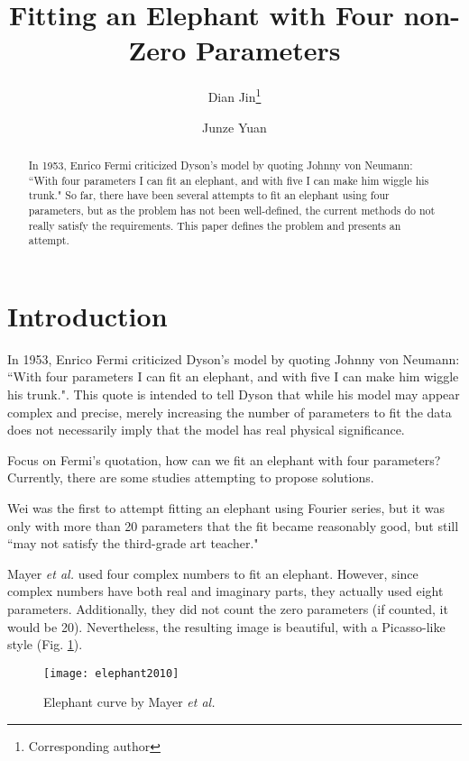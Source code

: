 \documentclass{article}
\title{Fitting an Elephant with Four non-Zero Parameters}
\author[1]{Dian Jin\thanks{Corresponding author} }
\author[2]{Junze Yuan}
\affil[1]{\textit{Research Institute for Intelligent Wearable Systems, The Hong Kong Polytechinic University}}
\affil[2]{\textit{Tampere University}}
\date{}
\begin{document}
	
\maketitle

\begin{abstract}
	In 1953, Enrico Fermi criticized Dyson’s model by quoting Johnny von Neumann: ``With four parameters I can fit an elephant, and with five I can make him wiggle his trunk." So far, there have been several attempts to fit an elephant using four parameters, but as the problem has not been well-defined, the current methods do not really satisfy the requirements. This paper defines the problem and presents an attempt.
\end{abstract}

\section{Introduction}
In 1953, Enrico Fermi criticized Dyson’s model by quoting Johnny von Neumann: ``With four parameters I can fit an elephant, and with five I can make him wiggle his trunk."\cite{dyson2004meeting}.
This quote is intended to tell Dyson that while his model may appear complex and precise, merely increasing the number of parameters to fit the data does not necessarily imply that the model has real physical significance. 

Focus on Fermi's quotation, how can we fit an elephant with four parameters? Currently, there are some studies attempting to propose solutions.

Wei \cite{wei1975least} was the first to attempt fitting an elephant using Fourier series, but it was only with more than 20 parameters that the fit became reasonably good, but still ``may not satisfy the third-grade art teacher."

Mayer \textit{et al.} \cite{mayerDrawingElephantFour2010} used four complex numbers to fit an elephant. However, since complex numbers have both real and imaginary parts, they actually used eight parameters. Additionally, they did not count the zero parameters (if counted, it would be 20). Nevertheless, the resulting image is beautiful, with a Picasso-like style (Fig. \ref{fig:elephant2010}).




\begin{figure}[h]
	\centering
	\texttt{[image: elephant2010]}
	\caption{Elephant curve by Mayer \textit{et al.}}
	\label{fig:elephant2010}
\end{figure}
\end{document}
